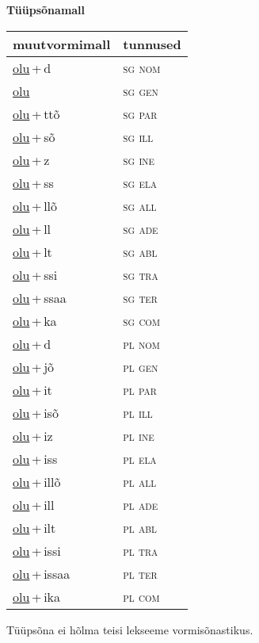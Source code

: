 
\vspace{1.8em}
\begin{minipage}{\textwidth}
\textbf{Tüüpsõnamall \,}\\

\begin{sideways}
\begin{tabular}{l l}
muutvormimall & tunnused \\
\hline
\underline{olu}\,+\,d & \textsc{ sg nom } \\
\underline{olu} & \textsc{ sg gen } \\
\underline{olu}\,+\,ttõ & \textsc{ sg par } \\
\underline{olu}\,+\,sõ & \textsc{ sg ill } \\
\underline{olu}\,+\,z & \textsc{ sg ine } \\
\underline{olu}\,+\,ss & \textsc{ sg ela } \\
\underline{olu}\,+\,llõ & \textsc{ sg all } \\
\underline{olu}\,+\,ll & \textsc{ sg ade } \\
\underline{olu}\,+\,lt & \textsc{ sg abl } \\
\underline{olu}\,+\,ssi & \textsc{ sg tra } \\
\underline{olu}\,+\,ssaa & \textsc{ sg ter } \\
\underline{olu}\,+\,ka & \textsc{ sg com } \\
\underline{olu}\,+\,d & \textsc{ pl nom } \\
\underline{olu}\,+\,jõ & \textsc{ pl gen } \\
\underline{olu}\,+\,it & \textsc{ pl par } \\
\underline{olu}\,+\,isõ & \textsc{ pl ill } \\
\underline{olu}\,+\,iz & \textsc{ pl ine } \\
\underline{olu}\,+\,iss & \textsc{ pl ela } \\
\underline{olu}\,+\,illõ & \textsc{ pl all } \\
\underline{olu}\,+\,ill & \textsc{ pl ade } \\
\underline{olu}\,+\,ilt & \textsc{ pl abl } \\
\underline{olu}\,+\,issi & \textsc{ pl tra } \\
\underline{olu}\,+\,issaa & \textsc{ pl ter } \\
\underline{olu}\,+\,ika & \textsc{ pl com } \\
\end{tabular}
\end{sideways}
\label{tab:tüüpsõnamall-olud}

\end{minipage}

 
\vspace{1em}
\noindent Tüüpsõna ei hõlma teisi lekseeme vormi\-sõnastikus.
